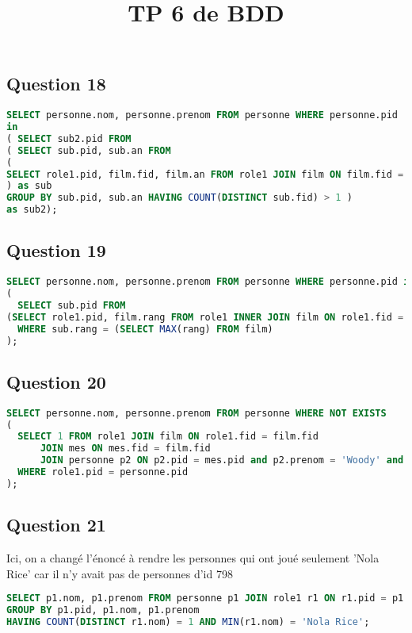\documentclass[a4paper]{article}
\title{TP 6 de BDD}
\begin{document}
\maketitle
\subsection*{Question 18}
\begin{lstlisting}[language=SQL]
SELECT personne.nom, personne.prenom FROM personne WHERE personne.pid 
in 
( SELECT sub2.pid FROM 
( SELECT sub.pid, sub.an FROM
(
SELECT role1.pid, film.fid, film.an FROM role1 JOIN film ON film.fid = role1.fid
) as sub 
GROUP BY sub.pid, sub.an HAVING COUNT(DISTINCT sub.fid) > 1 )
as sub2); 
\end{lstlisting}
\subsection*{Question 19}
\begin{lstlisting}[language=SQL]
SELECT personne.nom, personne.prenom FROM personne WHERE personne.pid in 
(
  SELECT sub.pid FROM 
(SELECT role1.pid, film.rang FROM role1 INNER JOIN film ON role1.fid = film.fid) as sub
  WHERE sub.rang = (SELECT MAX(rang) FROM film)
);
\end{lstlisting}

\subsection*{Question 20}
\begin{lstlisting}[language=SQL]
SELECT personne.nom, personne.prenom FROM personne WHERE NOT EXISTS
(
  SELECT 1 FROM role1 JOIN film ON role1.fid = film.fid 
      JOIN mes ON mes.fid = film.fid
      JOIN personne p2 ON p2.pid = mes.pid and p2.prenom = 'Woody' and p2.nom = 'Allen'
  WHERE role1.pid = personne.pid
); 
\end{lstlisting}
\subsection*{Question 21}
Ici, on a changé l'énoncé à rendre les personnes qui ont joué seulement 'Nola Rice' car il n'y avait pas de personnes d'id 798
\begin{lstlisting}[language=SQL]
SELECT p1.nom, p1.prenom FROM personne p1 JOIN role1 r1 ON r1.pid = p1.pid 
GROUP BY p1.pid, p1.nom, p1.prenom 
HAVING COUNT(DISTINCT r1.nom) = 1 AND MIN(r1.nom) = 'Nola Rice'; 
\end{lstlisting}
\end{document}
